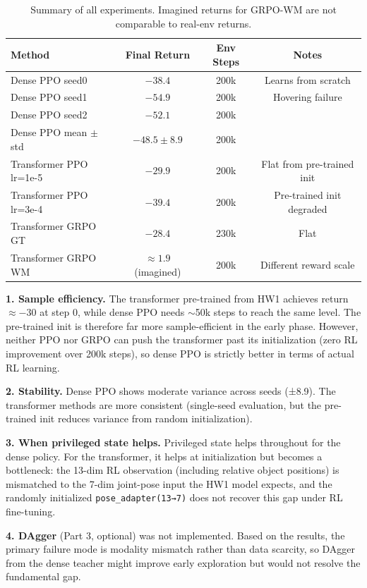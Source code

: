 \documentclass[11pt,letterpaper]{article}
\begin{document}
\begin{table}[h]
\centering
\begin{tabular}{lccc}
\toprule
Method & Final Return & Env Steps & Notes \\
\midrule
Dense PPO seed0 & $-38.4$ & 200k & Learns from scratch \\
Dense PPO seed1 & $-54.9$ & 200k & Hovering failure \\
Dense PPO seed2 & $-52.1$ & 200k & \\
Dense PPO mean $\pm$ std & $-48.5 \pm 8.9$ & 200k & \\
\midrule
Transformer PPO lr=1e-5 & $-29.9$ & 200k & Flat from pre-trained init \\
Transformer PPO lr=3e-4 & $-39.4$ & 200k & Pre-trained init degraded \\
Transformer GRPO GT & $-28.4$ & 230k & Flat \\
Transformer GRPO WM & $\approx 1.9$ (imagined) & 200k & Different reward scale \\
\bottomrule
\end{tabular}
\caption{Summary of all experiments. Imagined returns for GRPO-WM are not comparable to real-env returns.}
\end{table}

\textbf{1. Sample efficiency.} The transformer pre-trained from HW1 achieves return $\approx -30$ at step 0, while dense PPO needs $\sim$50k steps to reach the same level. The pre-trained init is therefore far more sample-efficient in the early phase. However, neither PPO nor GRPO can push the transformer past its initialization (zero RL improvement over 200k steps), so dense PPO is strictly better in terms of actual RL learning.

\textbf{2. Stability.} Dense PPO shows moderate variance across seeds (±8.9). The transformer methods are more consistent (single-seed evaluation, but the pre-trained init reduces variance from random initialization).

\textbf{3. When privileged state helps.} Privileged state helps throughout for the dense policy. For the transformer, it helps at initialization but becomes a bottleneck: the 13-dim RL observation (including relative object positions) is mismatched to the 7-dim joint-pose input the HW1 model expects, and the randomly initialized \texttt{pose\_adapter(13→7)} does not recover this gap under RL fine-tuning.

\textbf{4. DAgger} (Part 3, optional) was not implemented. Based on the results, the primary failure mode is modality mismatch rather than data scarcity, so DAgger from the dense teacher might improve early exploration but would not resolve the fundamental gap.
\end{document}
